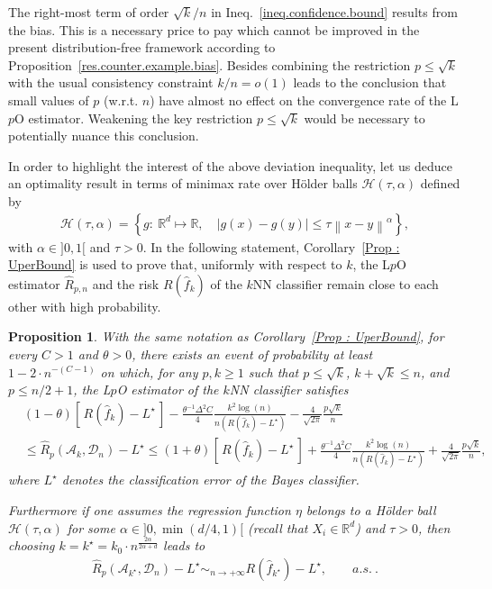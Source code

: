\documentclass[twoside,11pt]{article}
\numberwithin{equation}{section}
\newtheorem{prop}{Proposition}[section]
\newcommand{\1}{\mathds{1}}%
\newcommand{\paren}[1]{\left( #1 \right)}
\newcommand{\croch}[1]{\left[\, #1 \,\right]}
\newcommand{\acc}[1]{\left\{ #1 \right\}}
\newcommand{\norm}[1]{\left\| #1 \right\|}
\newcommand{\abs}[1]{\left\lvert #1 \right\rvert} %
\newcommand{\R}{\mathbb{R}}
\newcommand{\Rh}{\widehat{R}}
\newcommand{\Rhp}{\Rh_p}
\newcommand{\Dn}{\mathcal{D}_n}
\newcommand{\A}{\mathcal{A}}
\numberwithin{equation}{section}
\theoremstyle{plain}
\begin{document}
The right-most term of order $\sqrt{k}/n$ in Ineq.~\eqref{ineq.confidence.bound} results from the bias. This is a necessary price to pay which cannot be improved in the present distribution-free framework according to Proposition~\ref{res.counter.example.bias}.
%
Besides combining the restriction $p\leq \sqrt{k}$ with the usual consistency constraint $k/n = o(1)$ leads to the conclusion that small values of $p$ (w.r.t. $n$) have almost no effect on the convergence rate of the L$p$O estimator. Weakening the key restriction $p\leq \sqrt{k}$ would be necessary to potentially nuance this conclusion.


\medskip

In order to highlight the interest of the above deviation inequality, let us deduce an optimality result in terms of minimax rate  {over H\"older balls  $\mathcal{H}(\tau,\alpha)$ defined by
	\begin{align*}
	\mathcal{H}(\tau,\alpha) = \acc{ g:\ \R^d \mapsto \R, \quad \abs{g(x) - g(y)} \leq \tau \norm{x-y}^{\alpha} } ,
	\end{align*}
	with $\alpha \in ]0,1[$ and $\tau>0$.}
%
In the following statement, Corollary~\ref{Prop : UperBound} is used to prove that, uniformly with respect to $k$, the L$p$O estimator $\Rh_{p,n}$ and the risk $R(\hat f_k)$ of the $k$NN classifier remain close to each other with high probability.
%
\begin{prop}\label{res.optimal.minimax.rate}
	With the same notation as Corollary~\ref{Prop : UperBound}, for every $C>1$ and $\theta>0$, there exists an event of probability at least $1-2\cdot n^{-(C-1)}$ on which, for any $p,k \geq 1$ such that $p\leq \sqrt{k}$, $k+\sqrt{k}\leq n$, and $p\leq n/2+1$, the L$p$O estimator of the $k$NN classifier satisfies
		 \begin{align}
		 & \paren{1-\theta} \croch{ R(\hat{f}_k) - L^\star  } - \frac{\theta^{-1}\Delta^2 C }{4}  \frac{k^2\log(n)}{n\paren{R(\hat{f}_k) - L^\star}} - \frac{4}{\sqrt{2\pi} } \frac{p\sqrt{k}}{n}  \nonumber \\
		 &\leq \Rhp(\A_k,\Dn) - L^\star    \leq  \paren{1+\theta} \croch{ R(\hat{f}_k) - L^\star  }  + \frac{\theta^{-1}\Delta^2 C }{4}  \frac{k^2\log(n)}{n\paren{R(\hat{f}_k) - L^\star}} + \frac{4}{\sqrt{2\pi} } \frac{p\sqrt{k}}{n} ,\label{ineq.uniform.control.LpO.Holder}
		 \end{align}
	where $L^\star$ denotes the classification error of the Bayes classifier.

Furthermore if one assumes the regression function $\eta$ belongs to a H\"older ball $\mathcal{H}(\tau,\alpha)$ for some $\alpha \in ]0, {\min(d/4,1)}[$ (recall that $X_i\in \R^d$) and $\tau>0$, then choosing $k = k^\star = k_0 \cdot n^{\frac{2\alpha}{2\alpha+d}}$ leads to
 		 \begin{align}\label{eq.uniform.control.LpO.Holder.equiv}
 \Rhp(\A_{k^\star},\Dn) - L^\star   \sim_{n\to +\infty}  R(\hat{f}_{k^\star}) - L^\star, \qquad  {a.s.}\ .
 		 \end{align}
\end{prop}
\end{document}
